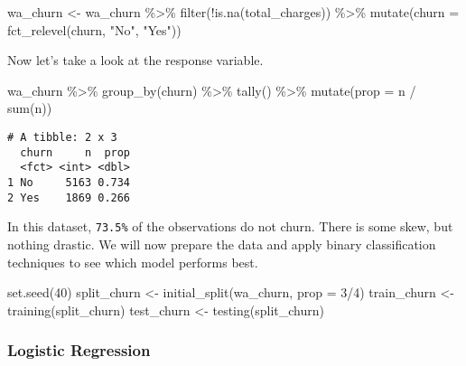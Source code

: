 \documentclass[
]{article}
\newenvironment{Shaded}{\begin{snugshade}}{\end{snugshade}}
\newcommand{\AttributeTok}[1]{\textcolor[rgb]{0.77,0.63,0.00}{#1}}
\newcommand{\DecValTok}[1]{\textcolor[rgb]{0.00,0.00,0.81}{#1}}
\newcommand{\FunctionTok}[1]{\textcolor[rgb]{0.00,0.00,0.00}{#1}}
\newcommand{\NormalTok}[1]{#1}
\newcommand{\OtherTok}[1]{\textcolor[rgb]{0.56,0.35,0.01}{#1}}
\newcommand{\SpecialCharTok}[1]{\textcolor[rgb]{0.00,0.00,0.00}{#1}}
\newcommand{\StringTok}[1]{\textcolor[rgb]{0.31,0.60,0.02}{#1}}
\begin{document}
\begin{Shaded}
\begin{Highlighting}[]
\NormalTok{wa\_churn }\OtherTok{\textless{}{-}}\NormalTok{ wa\_churn }\SpecialCharTok{\%\textgreater{}\%} \FunctionTok{filter}\NormalTok{(}\SpecialCharTok{!}\FunctionTok{is.na}\NormalTok{(total\_charges)) }\SpecialCharTok{\%\textgreater{}\%}
\FunctionTok{mutate}\NormalTok{(}\AttributeTok{churn =} \FunctionTok{fct\_relevel}\NormalTok{(churn, }\StringTok{"No"}\NormalTok{, }\StringTok{"Yes"}\NormalTok{))}
\end{Highlighting}
\end{Shaded}

Now let's take a look at the response variable.

\begin{Shaded}
\begin{Highlighting}[]
\NormalTok{wa\_churn }\SpecialCharTok{\%\textgreater{}\%} \FunctionTok{group\_by}\NormalTok{(churn) }\SpecialCharTok{\%\textgreater{}\%} \FunctionTok{tally}\NormalTok{() }\SpecialCharTok{\%\textgreater{}\%} \FunctionTok{mutate}\NormalTok{(}\AttributeTok{prop =}\NormalTok{ n }\SpecialCharTok{/} \FunctionTok{sum}\NormalTok{(n))}
\end{Highlighting}
\end{Shaded}

\begin{verbatim}
# A tibble: 2 x 3
  churn     n  prop
  <fct> <int> <dbl>
1 No     5163 0.734
2 Yes    1869 0.266
\end{verbatim}

In this dataset, \texttt{73.5\%} of the observations do not churn. There
is some skew, but nothing drastic. We will now prepare the data and
apply binary classification techniques to see which model performs best.

\begin{Shaded}
\begin{Highlighting}[]
\FunctionTok{set.seed}\NormalTok{(}\DecValTok{40}\NormalTok{)}
\NormalTok{split\_churn }\OtherTok{\textless{}{-}} \FunctionTok{initial\_split}\NormalTok{(wa\_churn, }\AttributeTok{prop =} \DecValTok{3}\SpecialCharTok{/}\DecValTok{4}\NormalTok{)}
\NormalTok{train\_churn }\OtherTok{\textless{}{-}} \FunctionTok{training}\NormalTok{(split\_churn)}
\NormalTok{test\_churn }\OtherTok{\textless{}{-}} \FunctionTok{testing}\NormalTok{(split\_churn)}
\end{Highlighting}
\end{Shaded}

\hypertarget{logistic-regression-1}{%
\subsubsection{Logistic Regression}\label{logistic-regression-1}}
\end{document}
